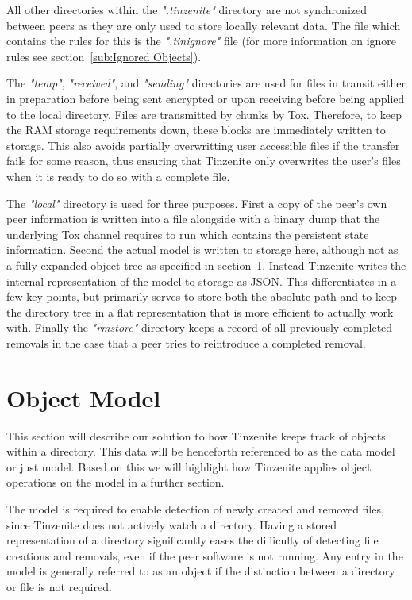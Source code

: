 All other directories within the \textit{".tinzenite"} directory are not synchronized between peers as they are only used to store locally relevant data.
The file which contains the rules for this is the \textit{".tinignore"} file (for more information on ignore rules see section~\ref{sub:Ignored Objects}).

The \textit{"temp"}, \textit{"received"}, and \textit{"sending"} directories are used for files in transit either in preparation before being sent encrypted or upon receiving before being applied to the local directory.
Files are transmitted by chunks by Tox.
Therefore, to keep the RAM storage requirements down, these blocks are immediately written to storage.
This also avoids partially overwritting user accessible files if the transfer fails for some reason, thus ensuring that Tinzenite only overwrites the user's files when it is ready to do so with a complete file.

The \textit{"local"} directory is used for three purposes.
First a copy of the peer's own peer information is written into a file alongside with a binary dump that the underlying Tox channel requires to run which contains the persistent state information.
Second the actual model is written to storage here, although not as a fully expanded object tree as specified in section~\ref{sec:Object Model}.
Instead Tinzenite writes the internal representation of the model to storage as JSON.
This differentiates in a few key points, but primarily serves to store both the absolute path and to keep the directory tree in a flat representation that is more efficient to actually work with.
Finally the \textit{"rmstore"} directory keeps a record of all previously completed removals in the case that a peer tries to reintroduce a completed removal.

\section{Object Model}
\label{sec:Object Model}

This section will describe our solution to how Tinzenite keeps track of objects within a directory.
This data will be henceforth referenced to as the data model or just model.
Based on this we will highlight how Tinzenite applies object operations on the model in a further section.

The model is required to enable detection of newly created and removed files, since Tinzenite does not actively watch a directory.
Having a stored representation of a directory significantly eases the difficulty of detecting file creations and removals, even if the peer software is not running.
Any entry in the model is generally referred to as an object if the distinction between a directory or file is not required.

